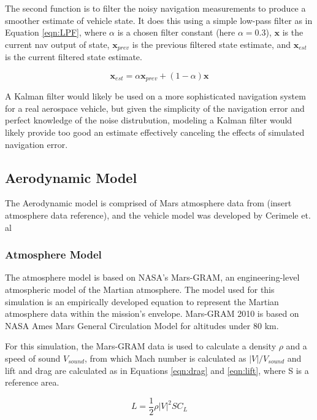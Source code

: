 The second function is to filter the noisy navigation measurements to produce a smoother estimate of vehicle state. It does this using a simple low-pass filter as in Equation \ref{eqn:LPF}, where $\alpha$ is a chosen filter constant (here $\alpha = 0.3$), $\bm{x}$ is the current nav output of state, $\bm{x}_{prev}$ is the previous filtered state estimate, and $\bm{x}_{est}$ is the current filtered state estimate. 

\begin{equation}
\label{eqn:LPF}
\bm{x}_{est} = \alpha \bm{x}_{prev} + (1-\alpha) \bm{x}
\end{equation}

A Kalman filter would likely be used on a more sophisticated navigation system for a real aerospace vehicle, but given the simplicity of the navigation error and perfect knowledge of the noise distrubution, modeling a Kalman filter would likely provide too good an estimate effectively canceling the effects of simulated navigation error.

\subsection{Aerodynamic Model}
The Aerodynamic model is comprised of Mars atmosphere data from (insert atmosphere data reference), and the vehicle model was developed by Cerimele et. al\:\cite{CERIMELE}

\subsubsection{Atmosphere Model}
The atmosphere model is based on NASA's Mars-GRAM\:\cite{MARSGRAM}, an engineering-level atmospheric model of the Martian atmosphere. The model used for this simulation is an empirically developed equation to represent the Martian atmosphere data within the mission's envelope. Mars-GRAM 2010 is based on NASA Ames Mars General Circulation Model for altitudes under 80 km.

For this simulation, the Mars-GRAM data is used to calculate a density $\rho$ and a speed of sound $V_{sound}$, from which Mach number is calculated as $|V|/V_{sound}$ and lift and drag are calculated as in Equations \ref{eqn:drag} and \ref{eqn:lift}, where S is a reference area.

\begin{equation}
\label{eqn:lift}
L = \frac{1}{2} \rho |V|^2 S C_L
\end{equation}

